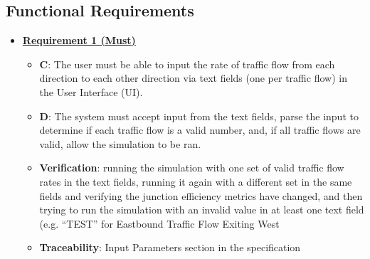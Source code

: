 \documentclass{article}
\begin{document}
\subsection{Functional Requirements}
\begin{itemize}
    \item \textbf{\underline{Requirement 1 (Must)}}
    \begin{itemize}
        \item \textbf{C}: The user must be able to input the rate of traffic flow from 
            each direction to each other direction via text fields (one per traffic flow) 
            in the User Interface (UI).
        \item \textbf{D}: The system must accept input from the text fields, parse the input to 
            determine if each traffic flow is a valid number, and, if all traffic flows 
            are valid, allow the simulation to be ran.
        \item \textbf{Verification}: running the simulation with one set of valid traffic 
            flow rates in the text fields, running it again with a different set in 
            the same fields and verifying the junction efficiency metrics have changed, 
            and then trying to run the simulation with an invalid value in at least one 
            text field (e.g. “TEST” for Eastbound Traffic Flow Exiting West
        \item\textbf{Traceability}: Input Parameters section in the specification
    \end{itemize}
    

\end{itemize}
\end{document}
